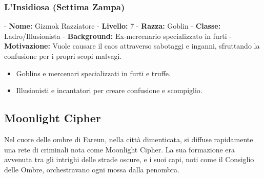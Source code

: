 \documentclass{article}
\begin{document}
              \subsubsection{ L'Insidiosa (Settima Zampa)}
   - \textbf{Nome:} Gizmok Razziatore
   - \textbf{Livello:} 7
   - \textbf{Razza:} Goblin
   - \textbf{Classe:} Ladro/Illusionista
   - \textbf{Background:} Ex-mercenario specializzato in furti
   - \textbf{Motivazione:} Vuole causare il caos attraverso sabotaggi e inganni, sfruttando la confusione per i propri scopi malvagi.
   \begin{itemize}
    \item Goblins e mercenari specializzati in furti e truffe.
    \item Illusionisti e incantatori per creare confusione e scompiglio.
\end{itemize}

  
  
          \subsection{Moonlight Cipher}
Nel cuore delle ombre di Fareun, nella città dimenticata, si diffuse rapidamente una rete di criminali nota come Moonlight Cipher. La sua formazione era avvenuta tra gli intrighi delle strade oscure, e i suoi capi, noti come il Consiglio delle Ombre, orchestravano ogni mossa dalla penombra.
\end{document}
